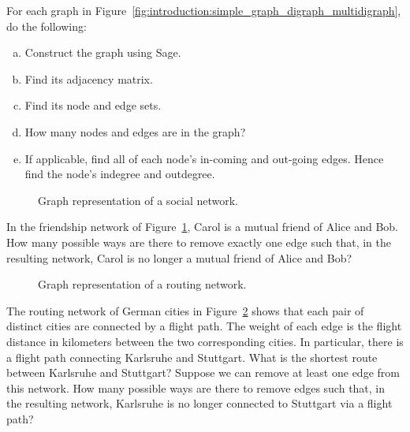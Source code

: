 \begin{problem}
\item For each graph in
  Figure~\ref{fig:introduction:simple_graph_digraph_multidigraph}, do
  the following:
  \begin{enumerate}[(a)]
  \item Construct the graph using Sage.

  \item Find its adjacency matrix.

  \item Find its node and edge sets.

  \item How many nodes and edges are in the graph?

  \item If applicable, find all of each node's in-coming and out-going
    edges. Hence find the node's indegree and outdegree.
  \end{enumerate}

  \begin{figure}[!htbp]
  \centering
  
  \caption{Graph representation of a social network.}
  \label{fig:introduction:social_network}
  \end{figure}

\item In the friendship network of
  Figure~\ref{fig:introduction:social_network}, Carol is a mutual
  friend of Alice and Bob. How many possible ways are there to remove
  exactly one edge such that, in the resulting network, Carol is no
  longer a mutual friend of Alice and Bob?

  \begin{figure}[!htbp]
  \centering
  
  \caption{Graph representation of a routing network.}
  \label{fig:introduction:routing_network}
  \end{figure}

\item The routing network of German cities in
  Figure~\ref{fig:introduction:routing_network} shows that each pair
  of distinct cities are connected by a flight path. The weight of
  each edge is the flight distance in kilometers between the two
  corresponding cities. In particular, there is a flight path
  connecting Karlsruhe and Stuttgart. What is the shortest route
  between Karlsruhe and Stuttgart? Suppose we can remove at least one
  edge from this network. How many possible ways are there to remove
  edges such that, in the resulting network, Karlsruhe is no longer
  connected to Stuttgart via a flight path?


\end{problem}
